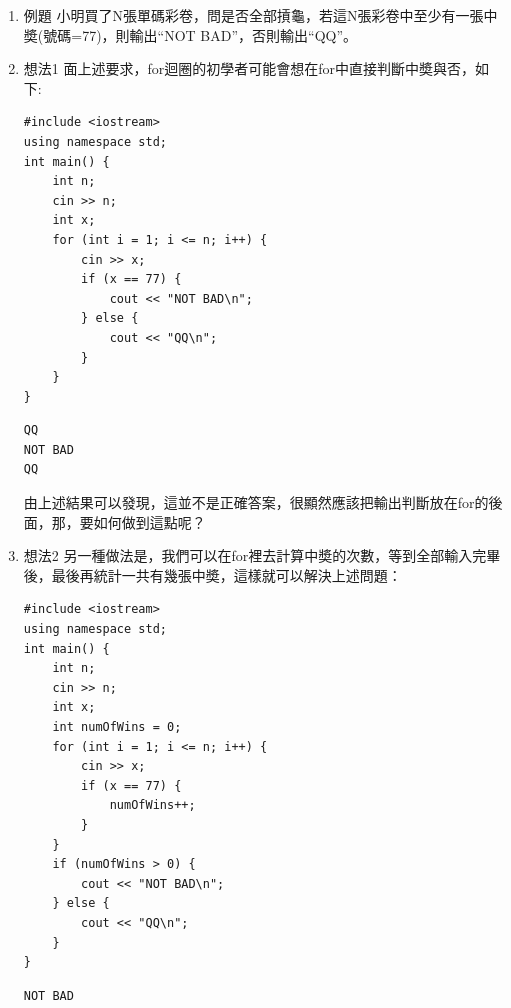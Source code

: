 \documentclass[a4paper,12pt]{article}
\begin{document}
\begin{enumerate}
\item 例題
\label{sec:org19e67b0}
小明買了N張單碼彩卷，問是否全部摃龜，若這N張彩卷中至少有一張中奬(號碼=77)，則輸出``NOT BAD''，否則輸出``QQ''。\\
\item 想法1
\label{sec:orgf86aed2}
面上述要求，for迴圈的初學者可能會想在for中直接判斷中奬與否，如下:\\
\lstset{breaklines=true,language=cpp,label= ,caption= ,captionpos=b,firstnumber=1,numbers=left}
\begin{lstlisting}
#include <iostream>
using namespace std;
int main() {
    int n;
    cin >> n;
    int x;
    for (int i = 1; i <= n; i++) {
        cin >> x;
        if (x == 77) {
            cout << "NOT BAD\n";
        } else {
            cout << "QQ\n";
        }
    }
}
\end{lstlisting}

\begin{verbatim}
QQ
NOT BAD
QQ
\end{verbatim}

由上述結果可以發現，這並不是正確答案，很顯然應該把輸出判斷放在for的後面，那，要如何做到這點呢？\\
\item 想法2
\label{sec:org2c8f2eb}
另一種做法是，我們可以在for裡去計算中奬的次數，等到全部輸入完畢後，最後再統計一共有幾張中奬，這樣就可以解決上述問題：\\
\lstset{breaklines=true,language=cpp,label= ,caption= ,captionpos=b,firstnumber=1,numbers=left}
\begin{lstlisting}
#include <iostream>
using namespace std;
int main() {
    int n;
    cin >> n;
    int x;
    int numOfWins = 0;
    for (int i = 1; i <= n; i++) {
        cin >> x;
        if (x == 77) {
            numOfWins++;
        }
    }
    if (numOfWins > 0) {
        cout << "NOT BAD\n";
    } else {
        cout << "QQ\n";
    }
}
\end{lstlisting}

\begin{verbatim}
NOT BAD
\end{verbatim}


\end{enumerate}
\end{document}
